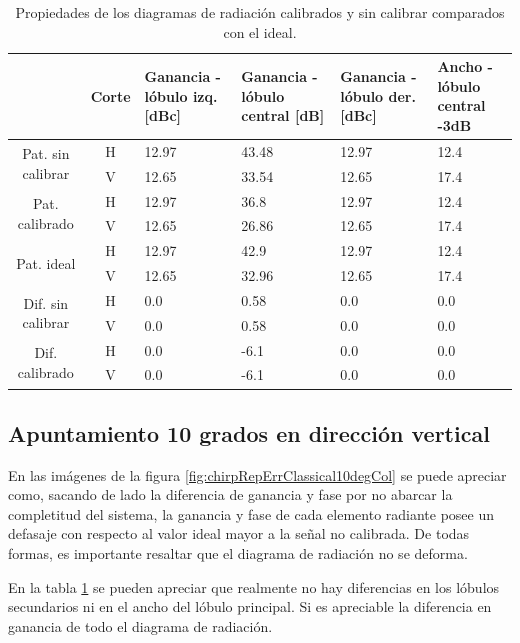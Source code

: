 \begin{table}[H]
  \footnotesize
  \centering
  \begin{tabular}{|c|c|p{2cm}|p{2.5cm}|p{2.5cm}|p{2.5cm}|}
    \cline{2-6}
    \multicolumn{1}{c|}{} & Corte & Ganancia - lóbulo izq. [dBc] & Ganancia - lóbulo central [dB] &
    Ganancia - lóbulo der. [dBc] & Ancho - lóbulo central -3dB \tabularnewline\hline
    \multirow{2}{2cm}{Pat. sin calibrar} & H & 12.97 & 43.48 & 12.97 & 12.4 \tabularnewline\cline{2-6}
     & V & 12.65 & 33.54 & 12.65 & 17.4 \tabularnewline\hline
    \multirow{2}{2cm}{Pat. calibrado} & H & 12.97 & 36.8 & 12.97 & 12.4 \tabularnewline\cline{2-6}
     & V & 12.65 & 26.86 & 12.65 & 17.4 \tabularnewline\hline
    \multirow{2}{2cm}{Pat. ideal} & H & 12.97 & 42.9 & 12.97 & 12.4 \tabularnewline\cline{2-6}
     & V & 12.65 & 32.96 & 12.65 & 17.4 \tabularnewline\hline
    \multirow{2}{2cm}{Dif. sin calibrar} & H & 0.0 & 0.58 & 0.0 & 0.0\tabularnewline\cline{2-6}
     & V & 0.0 & 0.58 & 0.0 & 0.0 \tabularnewline\hline
    \multirow{2}{2cm}{Dif. calibrado} & H & 0.0 & -6.1 & 0.0 & 0.0 \tabularnewline\cline{2-6}
     & V & 0.0 & -6.1 & 0.0 & 0.0 \tabularnewline\hline
  \end{tabular}
  \caption{Propiedades de los diagramas de radiación calibrados y sin calibrar comparados con el ideal.}
  \label{tab:chirpRepErrClassical10degCol}
\end{table}


\subsection{Apuntamiento 10 grados en dirección vertical}

En las imágenes de la figura \ref{fig:chirpRepErrClassical10degCol} se puede apreciar como, sacando de lado la diferencia de 
ganancia y fase por no abarcar la completitud del sistema, la ganancia y fase de cada elemento radiante posee un defasaje con 
respecto al valor ideal mayor a la señal no calibrada. De todas formas, es importante resaltar que el diagrama de radiación no 
se deforma. 

En la tabla \ref{tab:chirpRepErrClassical10degCol} se pueden apreciar que realmente no hay diferencias en los lóbulos secundarios 
ni en el ancho del lóbulo principal. Si es apreciable la diferencia en ganancia de todo el diagrama de radiación.

